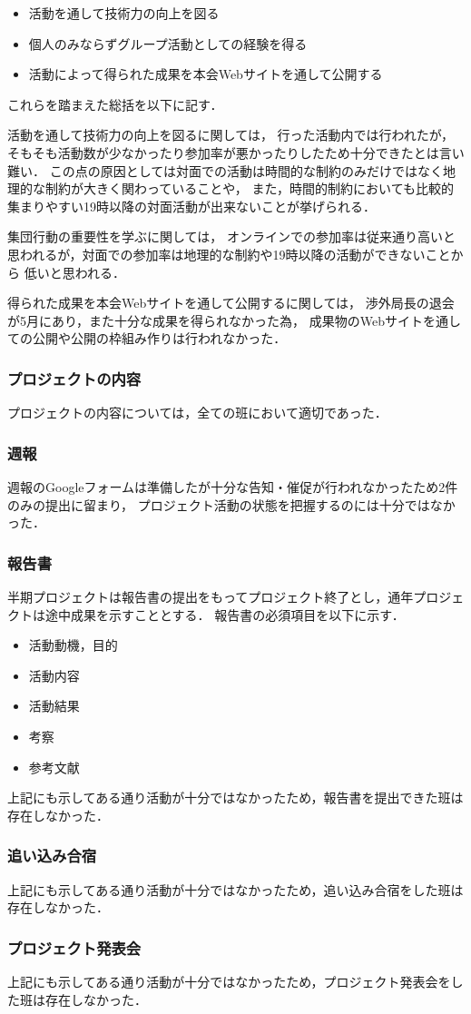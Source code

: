 \begin{itemize}
  \item 活動を通して技術力の向上を図る
  \item 個人のみならずグループ活動としての経験を得る
  \item 活動によって得られた成果を本会Webサイトを通して公開する
\end{itemize}

これらを踏まえた総括を以下に記す．

活動を通して技術力の向上を図るに関しては，
行った活動内では行われたが，そもそも活動数が少なかったり参加率が悪かったりしたため十分できたとは言い難い．
この点の原因としては対面での活動は時間的な制約のみだけではなく地理的な制約が大きく関わっていることや，
また，時間的制約においても比較的集まりやすい19時以降の対面活動が出来ないことが挙げられる．

集団行動の重要性を学ぶに関しては，
オンラインでの参加率は従来通り高いと思われるが，対面での参加率は地理的な制約や19時以降の活動ができないことから
低いと思われる．

得られた成果を本会Webサイトを通して公開するに関しては，
渉外局長の退会が5月にあり，また十分な成果を得られなかった為，
成果物のWebサイトを通しての公開や公開の枠組み作りは行われなかった．

\subsubsection*{プロジェクトの内容}
プロジェクトの内容については，全ての班において適切であった．

\subsubsection*{週報}
週報のGoogleフォームは準備したが十分な告知・催促が行われなかったため2件のみの提出に留まり，
プロジェクト活動の状態を把握するのには十分ではなかった．

\subsubsection*{報告書}
半期プロジェクトは報告書の提出をもってプロジェクト終了とし，通年プロジェクトは途中成果を示すこととする．
報告書の必須項目を以下に示す．

\begin{itemize}
  \item 活動動機，目的
  \item 活動内容
  \item 活動結果
  \item 考察
  \item 参考文献
\end{itemize}

上記にも示してある通り活動が十分ではなかったため，報告書を提出できた班は存在しなかった．

\subsubsection*{追い込み合宿}
上記にも示してある通り活動が十分ではなかったため，追い込み合宿をした班は存在しなかった．


\subsubsection*{プロジェクト発表会}
上記にも示してある通り活動が十分ではなかったため，プロジェクト発表会をした班は存在しなかった．
